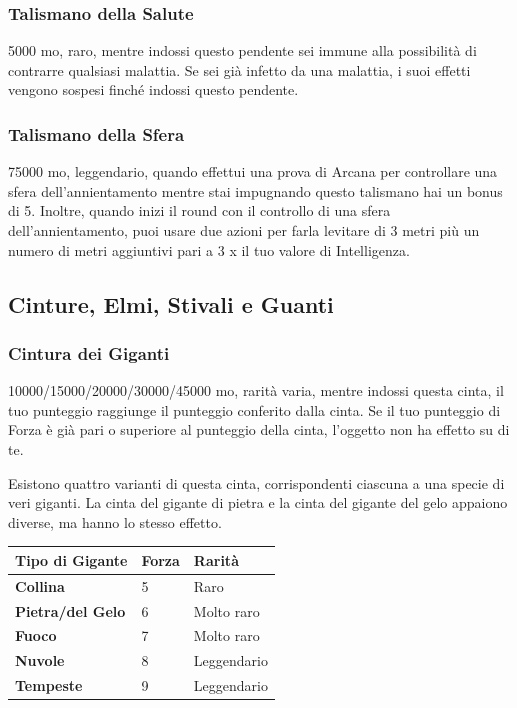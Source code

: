 \begin{multicols}{2}
	\subsubsection*{Talismano della Salute}
	5000 mo, raro, mentre indossi questo pendente sei immune alla possibilità di contrarre qualsiasi malattia. Se sei già infetto da una malattia, i suoi effetti vengono sospesi finché indossi questo pendente.

	\subsubsection*{Talismano della Sfera}
	75000 mo, leggendario, quando effettui una prova di Arcana per controllare una sfera dell'annientamento mentre stai impugnando questo talismano hai un bonus di 5. Inoltre, quando inizi il round con il controllo di una sfera dell'annientamento, puoi usare due azioni per farla levitare di 3 metri più un numero di metri aggiuntivi pari a 3 x il tuo valore di Intelligenza.

	\subsection{Cinture, Elmi, Stivali e Guanti}

	\subsubsection*{Cintura dei Giganti}

	10000/15000/20000/30000/45000 mo, rarità varia, mentre indossi questa cinta, il tuo punteggio raggiunge il punteggio conferito dalla cinta. Se il tuo punteggio di Forza è già pari o superiore al punteggio della cinta, l'oggetto non ha effetto su di te.

	Esistono quattro varianti di questa cinta, corrispondenti ciascuna a una specie di veri giganti. La cinta del gigante di pietra e la cinta del gigante del gelo appaiono diverse, ma hanno lo stesso effetto.

	\medskip

	\begin{tabular}{lll}
		\textbf{Tipo di Gigante}& \textbf{Forza} &\textbf{Rarità}\\
		\hline
		\textbf{Collina} &5& Raro\\
		\textbf{Pietra/del Gelo}& 6 &Molto raro\\
		\textbf{Fuoco} &7& Molto raro\\
		\textbf{Nuvole} &8& Leggendario\\
		\textbf{Tempeste}& 9& Leggendario\\
	\end{tabular}


\end{multicols}
